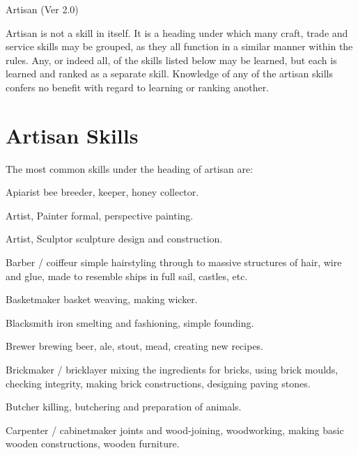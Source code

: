 \begin{Chapter}{Artisan (Ver 2.0)}

Artisan is not a skill in itself. It is a heading under which many
craft, trade and service skills may be grouped, as they all function
in a similar manner within the rules.  Any, or indeed all, of the
skills listed below may be learned, but each is learned and ranked as
a separate skill. Knowledge of any of the artisan skills confers no
benefit with regard to learning or ranking another.

\section{Artisan Skills}

The  most  common  skills  under  the  heading  of 
artisan are: 

\begin{Description}

\item[Apiarist] bee breeder, keeper, honey collector. 

\item[Artist, Painter] formal, perspective painting. 

\item[Artist, Sculptor] sculpture design and construction. 

\item[Barber / coiffeur] simple hairstyling through to massive
  structures of hair, wire and glue, made to resemble ships in full
  sail, castles, etc.

\item[Basketmaker] basket weaving, making wicker. 

\item[Blacksmith] iron smelting and fashioning, simple founding.

\item[Brewer] brewing beer, ale, stout, mead, creating new recipes.

\item[Brickmaker / bricklayer] mixing the ingredients for bricks,
  using brick moulds, checking integrity, making brick constructions,
  designing paving stones.

\item[Butcher] killing, butchering and preparation of animals.

\item[Carpenter / cabinetmaker] joints and wood-joining, woodworking,
  making basic wooden constructions, wooden furniture.


\end{Description}
\end{Chapter}
